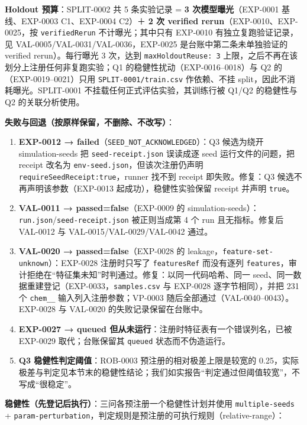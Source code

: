 \documentclass[
  11pt,
]{article}
\providecommand{\tightlist}{%
  \setlength{\itemsep}{0pt}\setlength{\parskip}{0pt}}
\begin{document}
\textbf{Holdout 预算}：SPLIT-0002 共 5 条实验记录 = \textbf{3
次模型曝光}（EXP-0001 基线、EXP-0003 C1、EXP-0004 C2）＋ \textbf{2 次
verified rerun}（EXP-0010、EXP-0025，按 \texttt{verifiedRerun}
不计曝光；其中只有 EXP-0010 有独立复跑验证记录，见
VAL-0005/VAL-0031/VAL-0036，EXP-0025 是台账中第二条未单独验证的 verified
rerun）。每行曝光 3 次，达到 \texttt{maxHoldoutReuse:\ 3}
上限，之后不再在该划分上注册任何非复跑实验；Q1
的稳健性扰动（EXP-0016--0018）与 Q2 的（EXP-0019--0021）只用
\texttt{SPLIT-0001/train.csv} 作依赖、不挂
split，因此不消耗曝光。SPLIT-0001 不挂载任何正式评估实验，其训练行被
Q1/Q2 的稳健性与 Q2 的关联分析使用。

\textbf{失败与回退（按原样保留，不删除、不改写）}：

\begin{enumerate}
\def\labelenumi{\arabic{enumi}.}
\tightlist
\item
  \textbf{EXP-0012 → failed}（\texttt{SEED\_NOT\_ACKNOWLEDGED}）：Q3
  候选为绕开 simulation-seeds 把 \texttt{seed-receipt.json} 误读成逐
  seed 运行文件的问题，把 receipt 改名为
  \texttt{env-seed.json}，但该次注册仍声明
  \texttt{requireSeedReceipt:true}，runner 找不到 receipt
  即失败。修复：Q3 候选不再声明该参数（EXP-0013 起成功），稳健性实验保留
  receipt 并声明 \texttt{true}。
\item
  \textbf{VAL-0011 → passed=false}（EXP-0009 的
  simulation-seeds）：\texttt{run.json}/\texttt{seed-receipt.json}
  被正则当成第 4 个 run 且无指标。修复后 VAL-0012 与
  VAL-0015/VAL-0029/VAL-0042 通过。
\item
  \textbf{VAL-0020 → passed=false}（EXP-0028 的
  leakage，\texttt{feature-set-unknown}）：EXP-0028 注册时只写了
  \texttt{featuresRef} 而没有逐列
  \texttt{features}，审计拒绝在``特征集未知''时判通过。修复：以同一代码哈希、同一
  seed、同一数据重建登记（EXP-0033，\texttt{samples.csv} 与 EXP-0028
  逐字节相同），并把 231 个 \texttt{chem\_\_} 输入列入注册参数；VP-0003
  随后全部通过（VAL-0040--0043）。EXP-0028 与 VAL-0020
  的失败记录保留在台账中。
\item
  \textbf{EXP-0027 → queued
  但从未运行}：注册时特征表有一个错误列名，已被 EXP-0029
  取代；台账保留其 \texttt{queued} 状态而不伪造运行。
\item
  \textbf{Q3 稳健性判定阈值}：ROB-0003 预注册的相对极差上限是较宽的
  0.25，实际极差与判定见本节末的稳健性结论；我们如实报告``判定通过但阈值较宽''，不写成``很稳定''。
\end{enumerate}

\textbf{稳健性（先登记后执行）}：三问各预注册一个稳健性计划并使用
\texttt{multiple-seeds} +
\texttt{param-perturbation}，判定规则是预注册的可执行规则（relative-range）：
\end{document}
